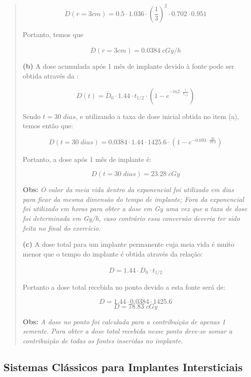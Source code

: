 \documentclass[11pt,a4paper]{article}
\begin{document}
\begin{quote}
					$$\dot{D}(r= 3cm) = 0.5 \cdot 1.036 \cdot \left(\frac{1}{3}\right)^2 \cdot 0.702 \cdot 0.951$$

					Portanto, temos que

					$$\dot{D}(r= 3cm) = 0.0384 \; cGy / h$$

				\textbf{(b)} A dose acumulada após 1 mês de implante devido à fonte pode ser obtida através da  :

					$$D(t) = \dot{D_0} \cdot 1.44 \cdot t_{1/2} \cdot \left(1 - e^{- ln 2 \cdot \frac{t}{t_{1/2}}}\right)$$

					Sendo $t = 30 \; dias$, e utilizando a taxa de dose inicial obtida no item (a), temos então que:

					$$D(t = 30 \; dias) = 0.0384 \cdot 1.44 \cdot 1425.6 \cdot \left(1 - e^{- 0.693 \cdot \frac{30}{59.4}}\right) $$

					Portanto, a dose após 1 mês de implante é:

					$$D(t = 30 \; dias) = 23.28 \; cGy$$

					\textbf{\textcolor{CarnationPink}{Obs:}} \textit{O valor da meia vida dentro da exponencial foi utilizado em dias para ficar da mesma dimensão do tempo de implante; Fora da exponencial foi utilizado em horas para obter a dose em Gy uma vez que a taxa de dose foi determinada em Gy/h, caso contrário essa conversão deveria ter sido feita no final do exercício.}

				\textbf{(c)} A dose total para um implante permanente cuja meia vida é muito menor que o tempo do implante é obtida através da relação:

					$$D = 1.44 \cdot \dot{D_0} \cdot t_{1/2}$$

					Portanto a dose total recebida no ponto devido a esta fonte será de:

					$$D = 1.44 \cdot 0.0384 \cdot 1425.6$$
					$$D = 78.83 \; cGy$$

				\textbf{\textcolor{CarnationPink}{Obs:}} \textit{ A dose no ponto foi calculada para a contribuição de apenas 1 semente. Para obter a dose total recebida nesse ponto deve-se somar a contribuição de todas as fontes inseridas no implante.}



			\end{quote}

		
		\subsection{Sistemas Clássicos para Implantes Intersticiais}
\end{document}
